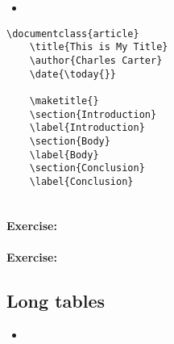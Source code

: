         \begin{framed}
            \begin{itemize}
                \item{}
            \end{itemize}
        \end{framed}


        \begin{verbatim}
\documentclass{article}
    \title{This is My Title}
    \author{Charles Carter}
    \date{\today{}}
 
    \maketitle{}
    \section{Introduction}
    \label{Introduction}
    \section{Body}
    \label{Body}
    \section{Conclusion}
    \label{Conclusion}
    
        \end{verbatim}

        \paragraph{Exercise:}

        \paragraph{Exercise:}

        \subsection{Long tables}
        \label{Long tables}
        
        \begin{framed}
            \begin{itemize}
                \item{}
            \end{itemize}
        \end{framed}


